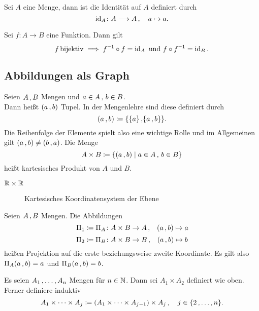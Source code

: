 \documentclass[../ana1.tex]{subfiles}
\begin{document}
\begin{defi*}[Identitätsabbildung]
	Sei \(A \) eine Menge, dann ist die Identität auf \(A \) definiert durch
	\[\operatorname{id}_{A} \colon A \longrightarrow A \operatorname{,} \quad a \mapsto a. \]
\end{defi*}


\begin{bem}
	Sei \(f \colon A \longrightarrow B \) eine Funktion. Dann gilt
	\[f \bijektiv \implies \inverse{f} \circ f = \id_{A} \text{ und } f \circ \inverse{f} = \id_{B}. \]
\end{bem}


\subsection{Abbildungen als Graph}

\begin{defi}
	Seien \(A \operatorname{,} B \) Mengen und \(a \in A \operatorname{,} \, b \in B \). \\
	Dann heißt \((a \operatorname{,} b) \) Tupel.
	In der Mengenlehre sind diese definiert durch 
	\[(a \operatorname{,} b) \coloneqq \{\{a\}\operatorname{,} \{a \operatorname{,} b\}\}. \]
	Die Reihenfolge der Elemente spielt also eine wichtige Rolle und im Allgemeinen gilt \((a \operatorname{,} b) \neq (b \operatorname{,} a) \).
	Die Menge
	\[A \times B \coloneqq \{(a \operatorname{,} b) \; \vert \; a \in A \operatorname{,} \, b \in B\} \]
	heißt kartesisches Produkt von \(A \) und \(B \).
\end{defi}

\begin{bsp}\(\mathbb{R} \times \mathbb{R} \) \\
	\begin{figure}[h!]
		\centering
		\caption{Kartesisches Koordinatensystem der Ebene}
	\end{figure}
\end{bsp}

\begin{defi*}
	Seien \(A \operatorname{,} B \) Mengen. Die Abbildungen
	\[\Pi_1 \coloneqq \Pi_A \colon A \times B \rightarrow A \operatorname{,} \quad (a \operatorname{,} b) \mapsto a \]
	\[\Pi_2 \coloneqq \Pi_B \colon A \times B \rightarrow B \operatorname{,} \quad (a \operatorname{,} b) \mapsto b \]
	heißen Projektion auf die erste beziehungsweise zweite Koordinate.
	Es gilt also \(\Pi_A(a \operatorname{,} b) = a \) und \(\Pi_B(a \operatorname{,} b) = b\).
\end{defi*}

\begin{defi*}
	Es seien \(A_1 \operatorname{,} \ldots \operatorname{,} A_n \) Mengen für \(n \in \mathbb{N} \). Dann sei \(A_1 \times A_2 \) definiert wie oben.
	Ferner definiere induktiv
	\[A_1 \times \cdots \times A_j \coloneqq (A_1 \times \cdots \times A_{j-1}) \times A_j \operatorname{,} \quad j \in \{2 \operatorname{,} \ldots \operatorname{,} n\}.\]
\end{defi*}
\end{document}
